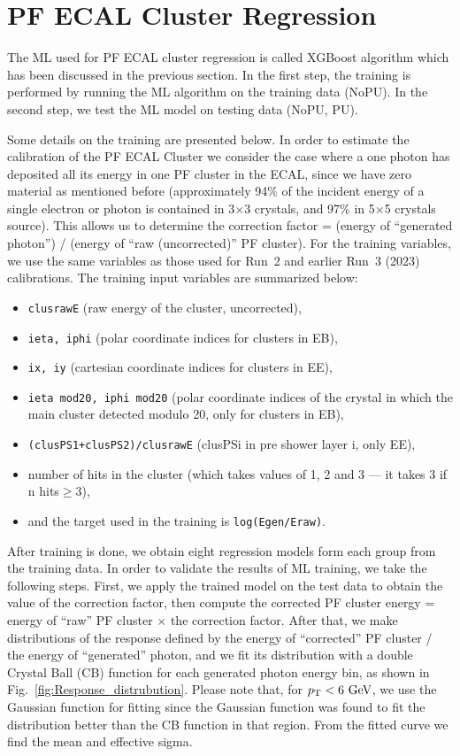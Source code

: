\section{PF ECAL Cluster Regression}
The ML used for PF ECAL cluster regression is called XGBoost algorithm which has been discussed in the previous section.
In the first step, the training is performed by running the ML algorithm on the training data (NoPU).
In the second step, we test the ML model on testing data (NoPU, PU).

Some details on the training are presented below.
In order to estimate the calibration of the PF ECAL Cluster we consider the case where a one photon has deposited all its energy in one PF cluster in the ECAL,
since we have zero material as mentioned before (approximately 94\% of the incident energy of a single electron or photon is contained in 3$\times$3 crystals, and 97\% in 5$\times$5 crystals source).
This allows us to determine the correction factor = (energy of ``generated photon'') / (energy of ``raw (uncorrected)'' PF cluster).
For the training variables, we use the same variables as those used for Run~2 and earlier Run~3 (2023) calibrations. The training input variables are summarized below: %
\begin{itemize}
\item {\tt clusrawE} (raw energy of the cluster, uncorrected),
\item {\tt ieta, iphi} (polar coordinate indices for clusters in EB),
\item {\tt ix, iy} (cartesian coordinate indices for clusters in EE),
\item {\tt ieta mod20, iphi mod20} (polar coordinate indices of the crystal in which the main cluster detected modulo 20, only for clusters in EB),
\item {\tt (clusPS1+clusPS2)/clusrawE} (clusPSi in pre shower layer i, only EE),
\item number of hits in the cluster (which takes values of 1, 2 and 3 --- it takes 3 if n hits$\geq3$),
\item and the target used in the training is {\tt log(Egen/Eraw)}.
\end{itemize}

\noindent
After training is done, we obtain eight regression models form each group from the training data.
In order to validate the results of ML training, we take the following steps.
First, we apply the trained model on the test data to obtain the value of the correction factor,
then compute the corrected PF cluster energy = energy of ``raw'' PF cluster $\times$ the correction factor.
After that, we make distributions of the response defined by the energy of ``corrected'' PF cluster / the energy of ``generated'' photon, and
we fit its distribution with a double Crystal Ball (CB) function for each generated photon energy bin, as shown in Fig.~\ref{fig:Response_distrubution}.
Please note that, for $p_{\mathrm{T}}<6\ \text{Ge\hspace{-.08em}V}$, we use the Gaussian function for fitting since the Gaussian function was found to fit the distribution better than the CB function in that \pt region.
From the fitted curve we find the mean and effective sigma.


